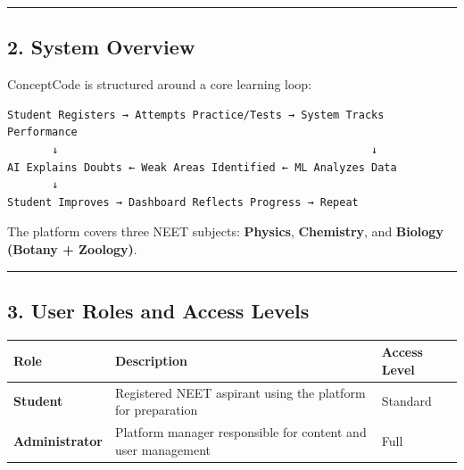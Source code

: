 \documentclass[
]{article}
\begin{document}
\begin{center}\rule{0.5\linewidth}{0.5pt}\end{center}

\subsection{2. System Overview}\label{system-overview}

ConceptCode is structured around a core learning loop:

\begin{verbatim}
Student Registers → Attempts Practice/Tests → System Tracks Performance
       ↓                                                 ↓
AI Explains Doubts ← Weak Areas Identified ← ML Analyzes Data
       ↓
Student Improves → Dashboard Reflects Progress → Repeat
\end{verbatim}

The platform covers three NEET subjects: \textbf{Physics},
\textbf{Chemistry}, and \textbf{Biology (Botany + Zoology)}.

\begin{center}\rule{0.5\linewidth}{0.5pt}\end{center}

\subsection{3. User Roles and Access
Levels}\label{user-roles-and-access-levels}

\begin{longtable}[]{@{}
  >{\raggedright\arraybackslash}p{}
  >{\raggedright\arraybackslash}p{}
  >{\raggedright\arraybackslash}p{}@{}}
\toprule\noalign{}
\begin{minipage}[b]{\linewidth}\raggedright
Role
\end{minipage} & \begin{minipage}[b]{\linewidth}\raggedright
Description
\end{minipage} & \begin{minipage}[b]{\linewidth}\raggedright
Access Level
\end{minipage} \\
\midrule\noalign{}
\endhead
\bottomrule\noalign{}
\endlastfoot
\textbf{Student} & Registered NEET aspirant using the platform for
preparation & Standard \\
\textbf{Administrator} & Platform manager responsible for content and
user management & Full \\
\end{longtable}
\end{document}
